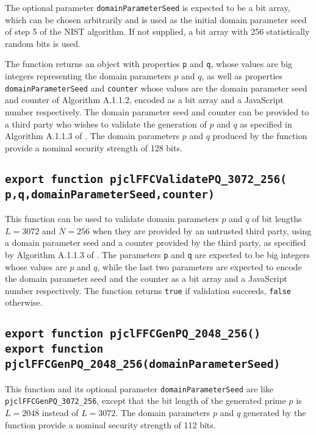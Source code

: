\documentclass[12pt]{article}
\begin{document}
The optional parameter {\tt domainParameterSeed} is expected to be a bit array,
which can be chosen arbitrarily and is used as the initial domain
parameter seed of step 5 of the NIST algorithm.  
If not supplied, a bit array with 256 statistically random bits is used.

The function returns
an object with properties {\tt p} and {\tt q}, whose values are 
big integers representing the 
domain parameters $p$ and $q$, as well as properties {\tt domainParameterSeed}
and {\tt counter} whose values are the domain parameter seed and counter of
Algorithm A.1.1.2, encoded as a bit array and a JavaScript number
respectively.  The domain parameter seed and counter can be 
provided to a third party who wishes to validate the generation of 
$p$ and $q$ as specified in Algorithm A.1.1.3 of \cite{DSS-4}.
The domain parameters $p$ and $q$ produced by the function
provide a nominal security strength of 128 bits.

\subsection{\tt export function pjclFFCValidatePQ\_3072\_256(\\\mbox{}\hspace{.2in}p,q,domainParameterSeed,counter)}

This function can be used to validate domain parameters $p$ and $q$
of bit lengths $L=3072$ and $N=256$
when they are provided by an untrusted third party, using a domain parameter seed and a counter provided
by the third party, as specified by Algorithm A.1.1.3 of \cite{DSS-4}.
The parameters {\tt p} and {\tt q} are expected to be big integers whose values are $p$ and $q$, 
while the last two parameters are expected to encode the domain parameter seed
and the counter as a bit array and a JavaScript number respectively.
The function returns {\tt true} if validation succeeds, {\tt false} otherwise.

\subsection{\tt export function pjclFFCGenPQ\_2048\_256()\\export function pjclFFCGenPQ\_2048\_256(domainParameterSeed)}

This function and its optional parameter {\tt domainParameterSeed} are
like {\tt pjclFFCGenPQ\_3072\_256}, except that the bit length
of the generated prime $p$ is $L=2048$ instead of $L=3072$.
The domain parameters $p$ and $q$ generated by the function
provide a nominal security strength of 112 bits.
\end{document}
